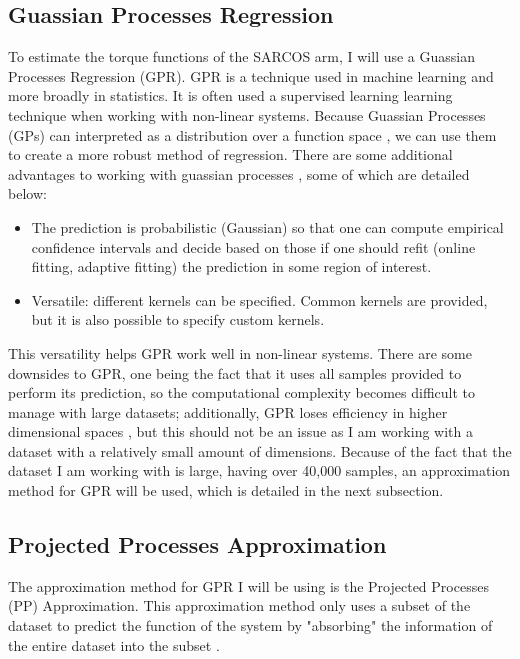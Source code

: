 \documentclass{article}
\begin{document}
    \subsection{Guassian Processes Regression}
    
    To estimate the torque functions of the SARCOS arm, I will use a Guassian Processes Regression
    (GPR). GPR is a technique used in machine learning and more broadly in statistics. It is often
    used a supervised learning learning technique when working with non-linear systems. Because
    Guassian Processes (GPs) can interpreted as a distribution over a function space \citep{gpml},
    we can use them to create a more robust method of regression. There are some additional
    advantages to working with guassian processes \citep{scikit-gp}, some of which are detailed
    below:
    
    \begin{itemize}
        \item The prediction is probabilistic (Gaussian) so that one can compute empirical confidence intervals and decide based on those if one should refit (online fitting, adaptive fitting) the prediction in some region of interest.
        \item Versatile: different kernels can be specified. Common kernels are provided, but it is also possible to specify custom kernels.
    \end{itemize}
    
    This versatility helps GPR work well in non-linear systems. There are some downsides to GPR,
    one being the fact that it uses all samples provided to perform its prediction, so the
    computational complexity becomes difficult to manage with large datasets; additionally, GPR
    loses efficiency in higher dimensional spaces \citep{scikit-gp}, but this should not be an
    issue as I am working with a dataset with a relatively small amount of dimensions. Because of
    the fact that the dataset I am working with is large, having over 40,000 samples, an
    approximation method for GPR will be used, which is detailed in the next subsection.
    
    \subsection{Projected Processes Approximation}
    
    The approximation method for GPR I will be using is the Projected Processes (PP) Approximation.
    This approximation method only uses a subset of the dataset to predict the function of the
    system by "absorbing" the information of the entire dataset into the subset \citep{gpml}.
    
\end{document}
